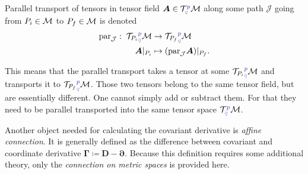 \begin{definition}
    Parallel transport of tensors in tensor field $\bm A\in \TT^{\bluee p}_{\blueee q} \M$ along some path $\mathcal J$ going from $P_i\in\mathcal{M}$ to $P_f\in\mathcal{M}$ is denoted
    \begin{align*}
        \Par_{\mathcal J}:\; {\TT _{P_i}}^{\bluee p}_{\blueee q}\M&\rightarrow {\TT_{P_f}}^{\bluee p}_{\blueee q}\M\\
        \bm A|_{P_i} &\mapsto (\Par_{\mathcal J} \bm A)|_{P_f}.
    \end{align*}
\end{definition}
This means that the parallel transport takes a tensor at some ${\TT_{P_i}}^{\bluee p}_{\blueee q} \M$ and transports it to ${\TT_{P_f}}^{\bluee p}_{\blueee q} \M$.  Those two tensors belong to the same tensor field, but are essentially different. One cannot simply add or subtract them. For that they need to be parallel transported into the same tensor space $\TT^{\bluee p}_{\blueee q} \M$.


Another object needed for calculating the covariant derivative is \emph{affine connection}. It is generally defined as the difference between covariant and coordinate derivative
$\bm \Gamma\coloneqq \bm D-\bm\partial$. Because this definition requires some additional theory, only the \emph{connection on metric spaces} is provided here.

